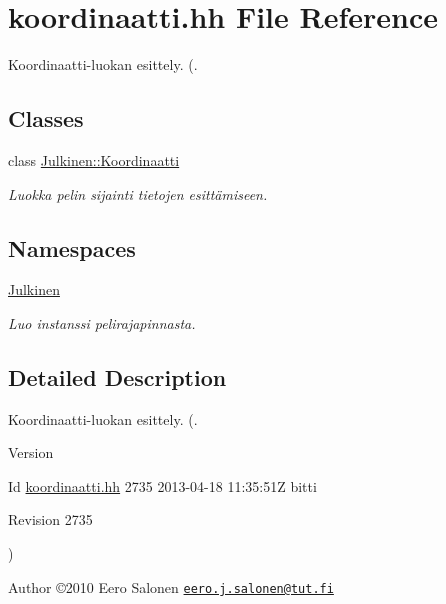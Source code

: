\hypertarget{koordinaatti_8hh}{}\section{koordinaatti.\+hh File Reference}
\label{koordinaatti_8hh}


Koordinaatti-\/luokan esittely. (.  


\subsection*{Classes}
\begin{DoxyCompactItemize}
\item 
class \hyperlink{class_julkinen_1_1_koordinaatti}{Julkinen\+::\+Koordinaatti}
\begin{DoxyCompactList}\small\item\em Luokka pelin sijainti tietojen esittämiseen. \end{DoxyCompactList}\end{DoxyCompactItemize}
\subsection*{Namespaces}
\begin{DoxyCompactItemize}
\item 
 \hyperlink{namespace_julkinen}{Julkinen}
\begin{DoxyCompactList}\small\item\em Luo instanssi pelirajapinnasta. \end{DoxyCompactList}\end{DoxyCompactItemize}


\subsection{Detailed Description}
Koordinaatti-\/luokan esittely. (. 

\begin{DoxyVersion}{Version}

\end{DoxyVersion}
\begin{DoxyParagraph}{Id}
\hyperlink{koordinaatti_8hh}{koordinaatti.\+hh} 2735 2013-\/04-\/18 11\+:35\+:51\+Z bitti 
\end{DoxyParagraph}


\begin{DoxyParagraph}{Revision}
2735 
\end{DoxyParagraph}
) \begin{DoxyAuthor}{Author}
©2010 Eero Salonen \href{mailto:eero.j.salonen@tut.fi}{\tt eero.\+j.\+salonen@tut.\+fi} 
\end{DoxyAuthor}
